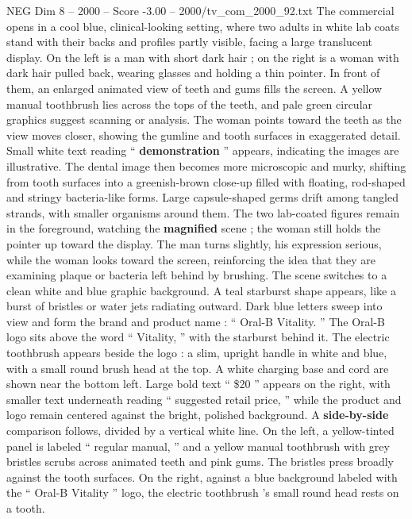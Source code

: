 \begin{textsample}{NEG Dim 8 – 2000 – Score -3.00 – 2000/tv\_com\_2000\_92.txt}  \label{ex:f8_neg_087}
The commercial opens in a cool blue, clinical-looking setting, where two adults in white lab coats stand with their backs and profiles partly visible, facing a large translucent display.
On the left is a man with short dark hair ; on the right is a woman with dark hair pulled back, wearing glasses and holding a thin pointer.
In front of them, an enlarged animated view of teeth and gums fills the screen.
A yellow manual toothbrush lies across the tops of the teeth, and pale green circular graphics suggest scanning or analysis.
The woman points toward the teeth as the view moves closer, showing the gumline and tooth surfaces in exaggerated detail.
Small white text reading “ \textbf{demonstration} ” appears, indicating the images are illustrative.
The dental image then becomes more microscopic and murky, shifting from tooth surfaces into a greenish-brown close-up filled with floating, rod-shaped and stringy bacteria-like forms.
Large capsule-shaped germs drift among tangled strands, with smaller organisms around them.
The two lab-coated figures remain in the foreground, watching the \textbf{magnified} scene ; the woman still holds the pointer up toward the display.
The man turns slightly, his expression serious, while the woman looks toward the screen, reinforcing the idea that they are examining plaque or bacteria left behind by brushing.
The scene switches to a clean white and blue graphic background.
A teal starburst shape appears, like a burst of bristles or water jets radiating outward.
Dark blue letters sweep into view and form the brand and product name : “ Oral-B Vitality. ” The Oral-B logo sits above the word “ Vitality, ” with the starburst behind it.
The electric toothbrush appears beside the logo : a slim, upright handle in white and blue, with a small round brush head at the top.
A white charging base and cord are shown near the bottom left.
Large bold text “ \$20 ” appears on the right, with smaller text underneath reading “ suggested retail price, ” while the product and logo remain centered against the bright, polished background.
A \textbf{side-by-side} comparison follows, divided by a vertical white line.
On the left, a yellow-tinted panel is labeled “ regular manual, ” and a yellow manual toothbrush with grey bristles scrubs across animated teeth and pink gums.
The bristles press broadly against the tooth surfaces.
On the right, against a blue background labeled with the “ Oral-B Vitality ” logo, the electric toothbrush ’s small round head rests on a tooth.

\end{textsample}
